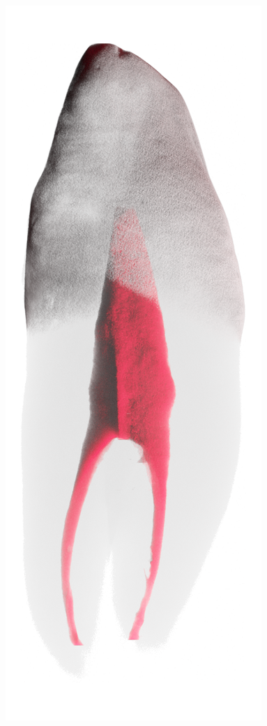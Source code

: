 \begin{frame}
\begin{frame}
		\includegraphics[height=\imageheight]{./images/rcs/Tooth0419}%

\end{frame}
\end{frame}
